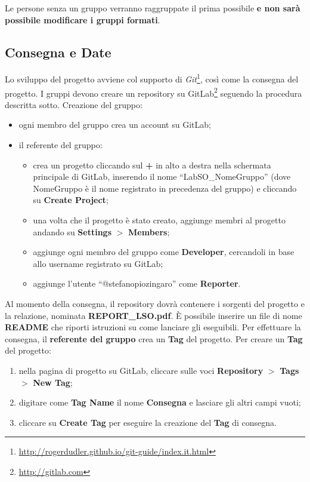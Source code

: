 \documentclass[12pt,a4paper,draft]{article}
\begin{document}
Le persone senza un gruppo verranno raggruppate il prima possibile \textbf{e non sarà possibile modificare i gruppi formati}.

\subsection{Consegna e Date}
%
Lo sviluppo del progetto avviene col supporto di \textit{Git}\footnote{\url{http://rogerdudler.github.io/git-guide/index.it.html}}, così come la consegna del progetto.
I gruppi devono creare un repository su GitLab\footnote{\url{http://gitlab.com}} seguendo la procedura descritta sotto.
%
\newline\noindent
Creazione del gruppo:
\begin{itemize}
    \item ogni membro del gruppo crea un account su GitLab;
    \item il referente del gruppo:
    \begin{itemize}
        \item crea un progetto cliccando sul \textbf{+} in alto a destra nella schermata principale di GitLab, inserendo il nome ``LabSO\_NomeGruppo'' (dove NomeGruppo è il nome registrato in precedenza del gruppo) e cliccando su \textbf{Create Project};
        \item una volta che il progetto è stato creato, aggiunge membri al progetto andando su \textbf{Settings} $>$ \textbf{Members};
        \item aggiunge ogni membro del gruppo come \textbf{Developer}, cercandoli in base allo username registrato su GitLab;
        \item aggiunge l'utente ``@stefanopiozingaro'' come \textbf{Reporter}.
    \end{itemize}
\end{itemize}
%
Al momento della consegna, il repository dovrà contenere i sorgenti del progetto e la relazione, nominata \textbf{REPORT\_LSO.pdf}. 
È possibile inserire un file di nome \textbf{README} che riporti istruzioni su come lanciare gli eseguibili.
Per effettuare la consegna, il \textbf{referente del gruppo} crea un \textbf{Tag} del progetto. 
Per creare un \textbf{Tag} del progetto:
\begin{enumerate}
    \item nella pagina di progetto su GitLab, cliccare sulle voci \textbf{Repository} $>$ \textbf{Tags} $>$ \textbf{New Tag}; 
    \item digitare come \textbf{Tag Name} il nome \textbf{Consegna} e lasciare gli altri campi vuoti;
    \item cliccare su \textbf{Create Tag} per eseguire la creazione del \textbf{Tag} di consegna.
\end{enumerate}
\end{document}
